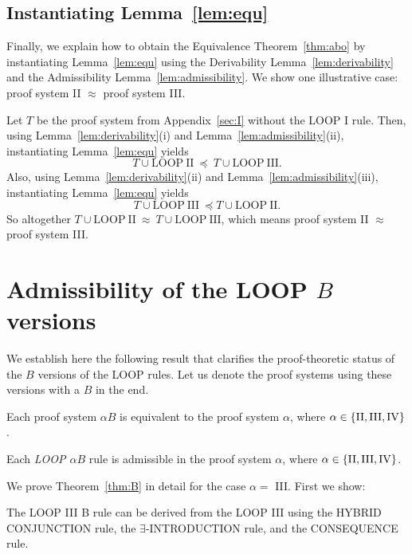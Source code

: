 \documentclass[manuscript, screen, review]{acmart}
\begin{document}
\subsection{Instantiating Lemma~\ref{lem:equ}}
\label{subsec:instantiate}

Finally, we explain how to obtain the Equivalence Theorem~\ref{thm:abo} by instantiating Lemma~\ref{lem:equ}
using the Derivability Lemma~\ref{lem:derivability} and the Admissibility Lemma~\ref{lem:admissibility}.
We show one illustrative case: proof system II $\approx$ proof system III.

Let $T$ be the proof system from Appendix~\ref{sec:I} without the LOOP I rule.
Then, using Lemma~\ref{lem:derivability}(i) and Lemma~\ref{lem:admissibility}(ii), 
instantiating Lemma~\ref{lem:equ} yields
\[
 T \cup \mathrm{LOOP\ II}\ \preceq\ T \cup \mathrm{LOOP\ III}.
\]
Also, using Lemma~\ref{lem:derivability}(ii) and Lemma~\ref{lem:admissibility}(iii), 
instantiating Lemma~\ref{lem:equ} yields
\[
 T \cup \mathrm{LOOP\ III}\ \preceq T \cup \mathrm{LOOP\ II}.
\]
So altogether $T \cup \mathrm{LOOP\ II}\ \approx\ T \cup \mathrm{LOOP\ III}$,
which means proof system II $\approx$ proof system III.



\section{Admissibility of the LOOP $B$ versions}
\label{sec:B}

We establish here the following result that clarifies the
proof-theoretic status of the $B$ versions of the LOOP rules.
Let us denote the proof systems using these versions with a $B$ in the end.

\begin{theorem}\label{thm:B}
  Each proof system $\alpha B$ is equivalent to the proof system
  $\alpha$, where $\alpha \in \{{\rm II, III, IV}\}$.
\end{theorem}

\begin{corollary}
  Each {\em LOOP $\alpha B$} rule is admissible in the proof system
  $\alpha$, where $\alpha \in \{{\rm II, III, IV}\}$.
\end{corollary}

We prove Theorem~\ref{thm:B} in detail for the case $\alpha=$ III.
First we show:

\begin{lemma}\label{lem:IIIB}
  The {\rm LOOP III} B rule can be derived from the {\rm LOOP III} using
  the {\rm HYBRID CONJUNCTION} rule,
  the {\rm $\exists$-INTRODUCTION} rule, and the {\rm CONSEQUENCE} rule.
\end{lemma}
\end{document}
